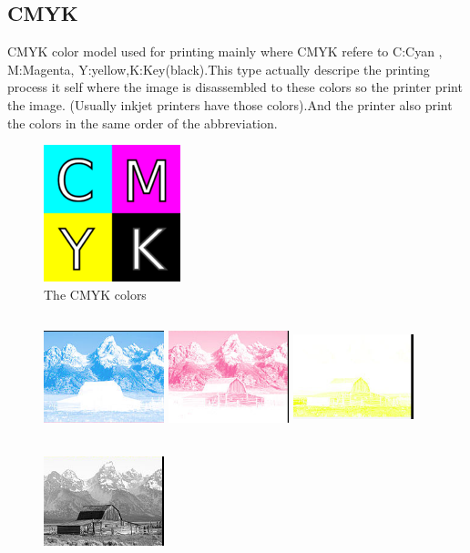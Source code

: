 \documentclass{article}
\begin{document}
\begin{multicols*}{2}
	\section*{CMYK}
	CMYK color model used for printing mainly where CMYK refere to C:Cyan , M:Magenta, Y:yellow,K:Key(black).This type actually descripe the printing process it self where the image is disassembled to these colors so the printer print the image. (Usually inkjet printers have those colors).And the printer also print the colors in the same order of the abbreviation.\cite{13}
	\begin{figure}[H]
\includegraphics[scale=0.7]{CMYK.png}
\caption{The CMYK colors}
	\end{figure}
	\begin{figure}[H]
	\includegraphics[height=35mm,width=35mm]{C.png}
	\includegraphics[height=35mm,width=35mm]{M.png}
	\includegraphics[height=35mm,width=35mm]{Yk.png}
	\includegraphics[height=35mm,width=35mm]{k.png}

\end{figure}
\end{multicols*}
\end{document}
